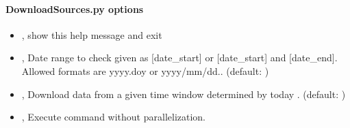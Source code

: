 \documentclass[letterpaper,10pt,english]{sphinxmanual}
\begin{document}
\paragraph{DownloadSources.py options}
\label{\detokenize{com:DownloadSources.py-options}}\begin{itemize}
\item {} 
\sphinxAtStartPar
{\hyperref[\detokenize{com:DownloadSources.py--h}]{}}, {\hyperref[\detokenize{com:DownloadSources.py---help}]{}} \sphinxhyphen{} show this help message and exit

\item {} 
\sphinxAtStartPar
{\hyperref[\detokenize{com:DownloadSources.py--date}]{}} , {\hyperref[\detokenize{com:DownloadSources.py---date_range}]{}}  \sphinxhyphen{} Date range to check given as {[}date\_start{]} or {[}date\_start{]} and {[}date\_end{]}. Allowed formats are yyyy.doy or yyyy/mm/dd.. (default: )

\item {} 
\sphinxAtStartPar
{\hyperref[\detokenize{com:DownloadSources.py--win}]{}} , {\hyperref[\detokenize{com:DownloadSources.py---window}]{}}  \sphinxhyphen{} Download data from a given time window determined by today \sphinxhyphen{} . (default: )

\item {} 
\sphinxAtStartPar
{\hyperref[\detokenize{com:DownloadSources.py--np}]{}}, {\hyperref[\detokenize{com:DownloadSources.py---noparallel}]{}} \sphinxhyphen{} Execute command without parallelization.

\end{itemize}
\end{document}
